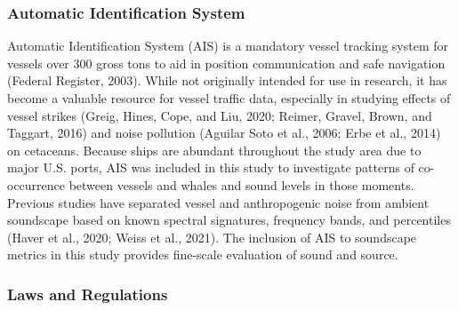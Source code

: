 \documentclass[
]{article}
\begin{document}
\hypertarget{automatic-identification-system}{%
\subsubsection{Automatic Identification
System}\label{automatic-identification-system}}

Automatic Identification System (AIS) is a mandatory vessel tracking
system for vessels over 300 gross tons to aid in position communication
and safe navigation (Federal Register, 2003). While not originally
intended for use in research, it has become a valuable resource for
vessel traffic data, especially in studying effects of vessel strikes
(Greig, Hines, Cope, and Liu, 2020; Reimer, Gravel, Brown, and Taggart,
2016) and noise pollution (Aguilar Soto et al., 2006; Erbe et al., 2014)
on cetaceans. Because ships are abundant throughout the study area due
to major U.S. ports, AIS was included in this study to investigate
patterns of co-occurrence between vessels and whales and sound levels in
those moments. Previous studies have separated vessel and anthropogenic
noise from ambient soundscape based on known spectral signatures,
frequency bands, and percentiles (Haver et al., 2020; Weiss et al.,
2021). The inclusion of AIS to soundscape metrics in this study provides
fine-scale evaluation of sound and source.

\hypertarget{laws-and-regulations}{%
\subsubsection{\texorpdfstring{\textbf{Laws and
Regulations}}{Laws and Regulations}}\label{laws-and-regulations}}
\end{document}
